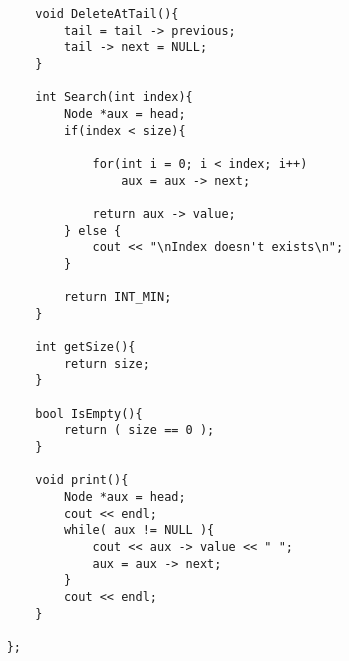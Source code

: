 \begin{lstlisting}
        void DeleteAtTail(){
            tail = tail -> previous;
            tail -> next = NULL;
        }

        int Search(int index){
            Node *aux = head;
            if(index < size){
                
                for(int i = 0; i < index; i++)
                    aux = aux -> next;
                
                return aux -> value;
            } else {
                cout << "\nIndex doesn't exists\n";
            }

            return INT_MIN;
        }

        int getSize(){
            return size;
        }

        bool IsEmpty(){
            return ( size == 0 );
        }

        void print(){
            Node *aux = head;
            cout << endl;
            while( aux != NULL ){
                cout << aux -> value << " ";
                aux = aux -> next;
            }
            cout << endl;   
        }

    };
\end{lstlisting}